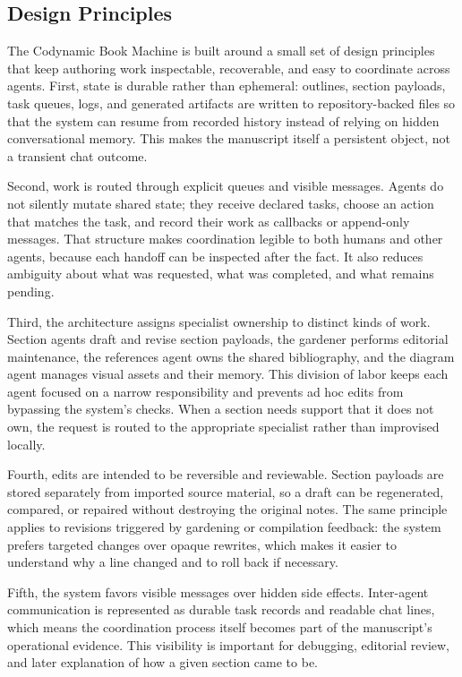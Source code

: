 \documentclass[11pt]{article}
\begin{document}
\subsection{Design Principles}


The Codynamic Book Machine is built around a small set of design principles that keep authoring work inspectable, recoverable, and easy to coordinate across agents. First, state is durable rather than ephemeral: outlines, section payloads, task queues, logs, and generated artifacts are written to repository-backed files so that the system can resume from recorded history instead of relying on hidden conversational memory. This makes the manuscript itself a persistent object, not a transient chat outcome.

Second, work is routed through explicit queues and visible messages. Agents do not silently mutate shared state; they receive declared tasks, choose an action that matches the task, and record their work as callbacks or append-only messages. That structure makes coordination legible to both humans and other agents, because each handoff can be inspected after the fact. It also reduces ambiguity about what was requested, what was completed, and what remains pending.

Third, the architecture assigns specialist ownership to distinct kinds of work. Section agents draft and revise section payloads, the gardener performs editorial maintenance, the references agent owns the shared bibliography, and the diagram agent manages visual assets and their memory. This division of labor keeps each agent focused on a narrow responsibility and prevents ad hoc edits from bypassing the system's checks. When a section needs support that it does not own, the request is routed to the appropriate specialist rather than improvised locally.

Fourth, edits are intended to be reversible and reviewable. Section payloads are stored separately from imported source material, so a draft can be regenerated, compared, or repaired without destroying the original notes. The same principle applies to revisions triggered by gardening or compilation feedback: the system prefers targeted changes over opaque rewrites, which makes it easier to understand why a line changed and to roll back if necessary.

Fifth, the system favors visible messages over hidden side effects. Inter-agent communication is represented as durable task records and readable chat lines, which means the coordination process itself becomes part of the manuscript's operational evidence. This visibility is important for debugging, editorial review, and later explanation of how a given section came to be.
\end{document}
